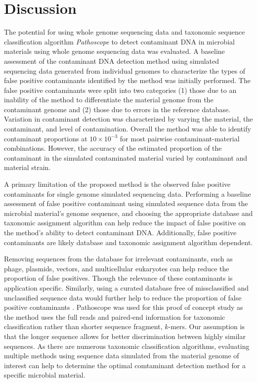 \documentclass[fleqn,10pt,lineno]{wlpeerj}\usepackage[]{graphicx}\usepackage[]{color}
\begin{document}
\section*{Discussion}

The potential for using whole genome sequencing data and taxonomic sequence classification algorithm \textit{Pathoscope} to detect contaminant DNA in microbial materials using whole genome sequencing data was evaluated. 
A baseline assessment of the contaminant DNA detection method using simulated sequencing data generated from individual genomes to characterize the types of false positive contaminants identified by the method was initially performed. 
The false positive contaminants were split into two categories (1) those due to an inability of the method to differentiate the material genome from the contaminant genome and (2) those due to errors in the reference database. 
Variation in contaminant detection was characterized by varying the material, the contaminant, and level of contamination. 
Overall the method was able to identify contaminant proportions at $10 \times 10^{-3}$ for most pairwise contaminant-material combinations. 
However, the accuracy of the estimated proportion of the contaminant in the simulated contaminated material varied by contaminant and material strain. 

A primary limitation of the proposed method is the observed false positive contaminants for single genome simulated sequencing data. 
Performing a baseline assessment of false positive contaminant using simulated sequence data from the microbial material's genome sequence, 
and choosing the appropriate database and taxonomic assignment algorithm can help reduce the impact of false positive on the method's ability to detect contaminant DNA. 
Additionally, false positive contaminants are likely database and taxonomic assignment algorithm dependent. 

Removing sequences from the database for irrelevant contaminants, such as phage, plasmids, vectors, and multicellular eukaryotes can help reduce the proportion of false positives. 
Though the relevance of these contaminants is application specific. 
Similarly, using a curated database free of missclassified and unclassified sequence data would further help to reduce the proportion of false positive contaminants \citep{tennessen2015prodege}. 
Pathoscope was used for this proof of concept study as the method uses the full reads and paired-end information for taxonomic classification rather than shorter sequence fragment, $k$-mers. 
Our assumption is that the longer sequence allows for better discrimination between highly similar sequences. 
As there are numerous taxonomic classification algorithms, evaluating multiple methods using sequence data simulated from the material genome of interest can help to determine the optimal comtaminant detection method for a specific microbial material. 
\end{document}
